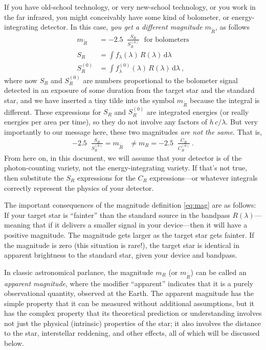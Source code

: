 \documentclass[10pt]{article}
\newcommand{\dd}{\mathrm{d}}
\DeclareMathOperator{\logten}{log_{10}}
\begin{document}
If you have old-school technology, or very new-school technology, or you work in the far infrared, you might conceivably have some kind of bolometer, or energy-integrating detector.
In this case, \emph{you get a different magnitude} $m_{\widetilde{R}}$, as follows
\begin{align}
    m_{\widetilde{R}} &= -2.5\logten\frac{S_R}{S^{(0)}_R} \mbox{~~for bolometers}\\
    S_R &= \int f_\lambda(\lambda)\,R(\lambda)\,\dd\lambda\\
    S^{(0)}_R &= \int f^{(0)}_\lambda(\lambda)\,R(\lambda)\,\dd\lambda~,
\end{align}
where now $S_R$ and $S^{(0)}_R$ are numbers proportional to the bolometer signal detected in an exposure of some duration from the target star and the standard star,
and we have inserted a tiny tilde into the symbol $m_{\widetilde{R}}$ because the integral is different.
These expressions for $S_R$ and $S^{(0)}_R$ are integrated energies (or really energies per area per time), so they do not involve any factors of $h\,c/\lambda$.
But very importantly to our message here, these two magnitudes \emph{are not the same}.
That is,
\begin{align}
    -2.5\logten\frac{S_R}{S^{(0)}_R} = m_{\widetilde{R}} &\ne m_R = -2.5\logten\frac{C_R}{C^{(0)}_R} ~.
\end{align}
From here on, in this document, we will assume that your detector is of the photon-counting variety, not the energy-integrating variety.
If that's not true, then substitute the $S_R$ expressions for the $C_R$ expressions---or whatever integrals correctly represent the physics of your detector.

The important consequences of the magnitude definition \eqref{eq:mag} are as follows:
If your target star is ``fainter'' than the standard source in the bandpass $R(\lambda)$---meaning that if it delivers a smaller signal in your device---then it will have a positive magnitude.
The magnitude gets larger as the target star gets fainter.
If the magnitude is zero (this situation is rare!), the target star is identical in apparent brightness to the standard star, given your device and bandpass.

In classic astronomical parlance, the magnitude $m_R$ (or $m_{\widetilde{R}}$) can be called an \emph{apparent magnitude}, where the modifier ``apparent'' indicates that it is a purely observational quantity, observed at the Earth.
The apparent magnitude has the simple property that it can be measured without additional assumptions, but it has the complex property that its theoretical prediction or understanding involves not just the physical (intrinsic) properties of the star; it also involves the distance to the star, interstellar reddening, and other effects, all of which will be discussed below.
\end{document}
